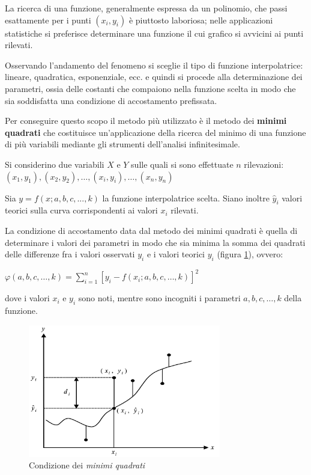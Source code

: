 La ricerca di una funzione, generalmente espressa da un polinomio, che passi esattamente per i punti $(x_i, y_i)$ è piuttosto laboriosa; nelle applicazioni statistiche si preferisce determinare una funzione il cui grafico si avvicini ai punti rilevati.

Osservando l’andamento del fenomeno si sceglie il tipo di funzione interpolatrice: lineare, quadratica, esponenziale, ecc. e quindi si procede alla determinazione dei parametri, ossia delle costanti che compaiono nella funzione scelta in modo che sia soddisfatta una condizione di accostamento prefissata.

Per conseguire questo scopo il metodo più utilizzato è il metodo dei \textbf{minimi quadrati} che costituisce un’applicazione della ricerca del minimo di una funzione di più variabili mediante gli strumenti dell’analisi infinitesimale.

Si considerino due variabili $X$ e $Y$ sulle quali si sono effettuate $n$ rilevazioni: $\left(x_{1}, y_{1}\right),\left(x_{2}, y_{2}\right), \ldots,\left(x_{i}, y_{i}\right), \ldots,\left(x_{n}, y_{n}\right)$

Sia $y=f(x; a, b, c, ..., k)$ la funzione interpolatrice scelta. Siano inoltre $\hat{y}_{i}$ valori teorici sulla curva corrispondenti ai valori $x_i$ rilevati.

La condizione di accostamento data dal metodo dei minimi quadrati è quella di determinare i valori dei parametri in modo che sia minima la somma dei quadrati delle differenze fra i valori osservati $y_i$ e i valori teorici $y_i$ (figura \ref{fig:minimi_quadrati}), ovvero:

$\varphi(a, b, c, \ldots, k)=\sum_{i=1}^{n}\left[y_{i}-f\left(x_{i} ; a, b, c, \ldots, k\right)\right]^{2}$

dove i valori $x_i$ e $y_i$ sono noti, mentre sono incogniti i parametri $a , b , c , … , k$ della funzione. \cite{excel_per_statistica_belluco}

\begin{figure}[H]
\centering
\includegraphics[width=0.75\textwidth,height=\textheight,keepaspectratio]{img/minimi_quadrati.png}
\caption{Condizione dei \textit{minimi quadrati} \cite{excel_per_statistica_belluco}}
\label{fig:minimi_quadrati}
\end{figure}

